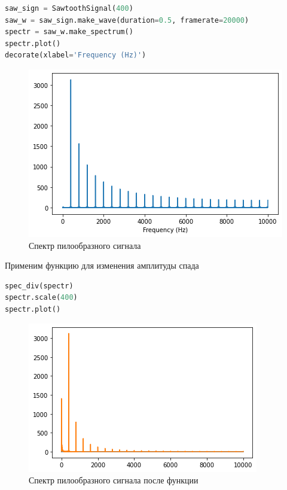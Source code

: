 \begin{lstlisting}[language=Python]
saw_sign = SawtoothSignal(400)
saw_w = saw_sign.make_wave(duration=0.5, framerate=20000)
spectr = saw_w.make_spectrum()
spectr.plot()
decorate(xlabel='Frequency (Hz)')
\end{lstlisting}

\begin{figure}[H]
	\begin{center}
		\includegraphics[scale=1]{fig/lab02/lab02_10.png}
		\caption{Спектр пилообразного сигнала}
	\end{center}
\end{figure}

Применим функцию для изменения амплитуды спада

\begin{lstlisting}[language=Python]
spec_div(spectr)
spectr.scale(400)
spectr.plot()
\end{lstlisting}

\begin{figure}[H]
	\begin{center}
		\includegraphics[scale=1]{fig/lab02/lab02_11.png}
		\caption{Спектр пилообразного сигнала после функции}
	\end{center}
\end{figure}

